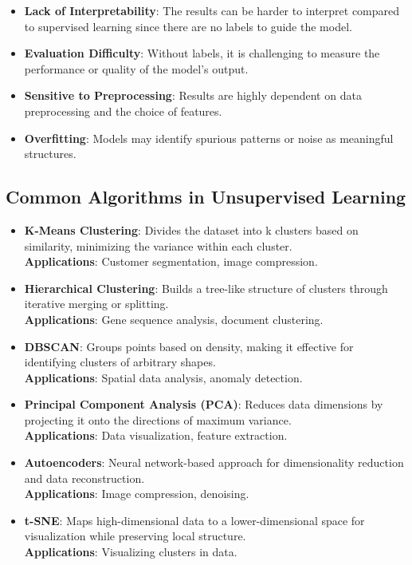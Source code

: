 \begin{itemize}
    \item \textbf{Lack of Interpretability}: The results can be harder to interpret compared to supervised learning since there are no labels to guide the model.
    \item \textbf{Evaluation Difficulty}: Without labels, it is challenging to measure the performance or quality of the model's output.
    \item \textbf{Sensitive to Preprocessing}: Results are highly dependent on data preprocessing and the choice of features.
    \item \textbf{Overfitting}: Models may identify spurious patterns or noise as meaningful structures.
\end{itemize}

\subsection*{Common Algorithms in Unsupervised Learning}

\begin{itemize}
    \item \textbf{K-Means Clustering}: Divides the dataset into k clusters based on similarity, minimizing the variance within each cluster.\\
    \textbf{Applications}: Customer segmentation, image compression.
    \item \textbf{Hierarchical Clustering}: Builds a tree-like structure of clusters through iterative merging or splitting.\\
    \textbf{Applications}: Gene sequence analysis, document clustering.
    \item \textbf{DBSCAN}: Groups points based on density, making it effective for identifying clusters of arbitrary shapes.\\
    \textbf{Applications}: Spatial data analysis, anomaly detection.
    \item \textbf{Principal Component Analysis (PCA)}: Reduces data dimensions by projecting it onto the directions of maximum variance.\\
    \textbf{Applications}: Data visualization, feature extraction.
    \item \textbf{Autoencoders}: Neural network-based approach for dimensionality reduction and data reconstruction.\\
    \textbf{Applications}: Image compression, denoising.
    \item \textbf{t-SNE}: Maps high-dimensional data to a lower-dimensional space for visualization while preserving local structure.\\
    \textbf{Applications}: Visualizing clusters in data.
\end{itemize}

